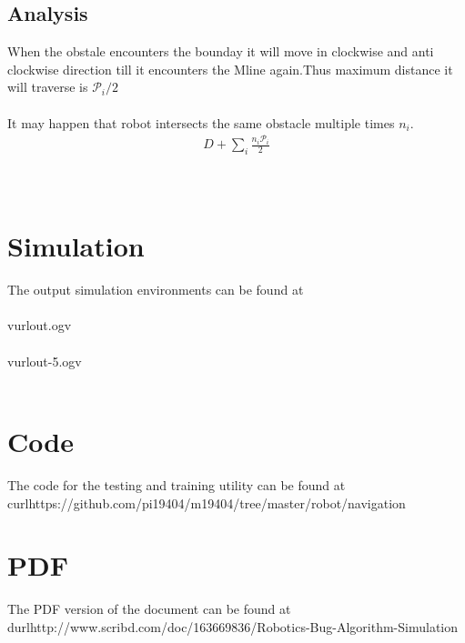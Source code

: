 \documentclass[fontsize=12pt, %
                             paper=a4, %
                             oneside, %
                             captions=tableheading,
                             index=totoc,
                             hyperref]{labbook}
\begin{document}
\subsection{Analysis}
When the obstale encounters the bounday it will move in clockwise and anti clockwise
direction till it encounters the Mline again.Thus maximum distance it will traverse
is $\mathcal{P}_i/2$
\\\\
It may happen that robot intersects the same obstacle multiple times $n_i$.
\begin{eqnarray}
 D + \sum_i \frac{n_i \mathcal{P}_i}{2}
\end{eqnarray}
\\\\

\section{Simulation}
The output simulation environments can be found at \\\\
vurl{out.ogv}\\\\
vurl{out-5.ogv}\\\\
\section{Code}
The code for the testing and training utility can be found at
curl{https://github.com/pi19404/m19404/tree/master/robot/navigation}
\section{PDF}
The PDF version of the document can be found at
durl{http://www.scribd.com/doc/163669836/Robotics-Bug-Algorithm-Simulation}




% 

% 






\nocite{*}
\end{document}
